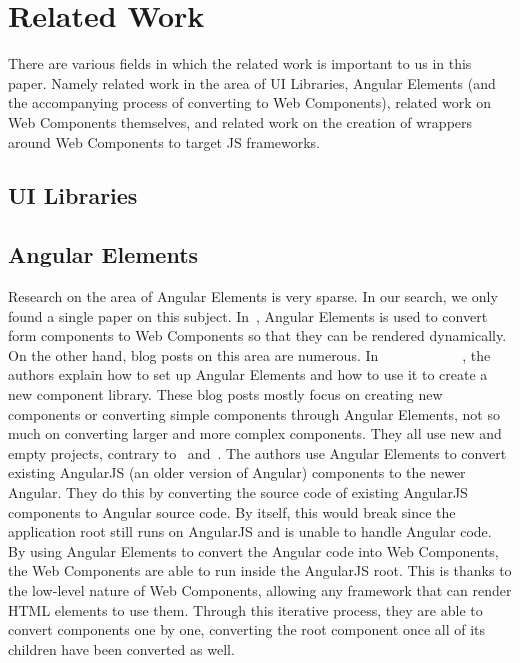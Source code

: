 \section{Related Work}\label{sec:related-work}

There are various fields in which the related work is important to us in this paper. Namely related work in the area of UI Libraries, Angular Elements (and the accompanying process of converting to Web Components), related work on Web Components themselves, and related work on the creation of wrappers around Web Components to target JS frameworks.

\subsection{UI Libraries}

\subsection{Angular Elements}
Research on the area of Angular Elements is very sparse. In our search, we only found a single paper on this subject. In~\cite{armengol2020development}, Angular Elements is used to convert form components to Web Components so that they can be rendered dynamically. On the other hand, blog posts on this area are numerous. In~\cite{basal_2019}~\cite{kitson_2019}~\cite{mackey-paulsen_2020}~\cite{nalepa_2020}~\cite{notiz.dev_2020}~\cite{sonara_2020}~\cite{strumpflohner_2019}~\cite{studio_la_cosa_nostra_2020}~\cite{s_2019}~\cite{techiediaries_team_2020}~\cite{vardanyan_2020}~\cite{williams_2020}, the authors explain how to set up Angular Elements and how to use it to create a new component library. These blog posts mostly focus on creating new components or converting simple components through Angular Elements, not so much on converting larger and more complex components. They all use new and empty projects, contrary to~\cite{helgevold_2019} and~\cite{seaman_2019}. The authors use Angular Elements to convert existing AngularJS (an older version of Angular) components to the newer Angular. They do this by converting the source code of existing AngularJS components to Angular source code. By itself, this would break since the application root still runs on AngularJS and is unable to handle Angular code. By using Angular Elements to convert the Angular code into Web Components, the Web Components are able to run inside the AngularJS root. This is thanks to the low-level nature of Web Components, allowing any framework that can render HTML elements to use them. Through this iterative process, they are able to convert components one by one, converting the root component once all of its children have been converted as well.

